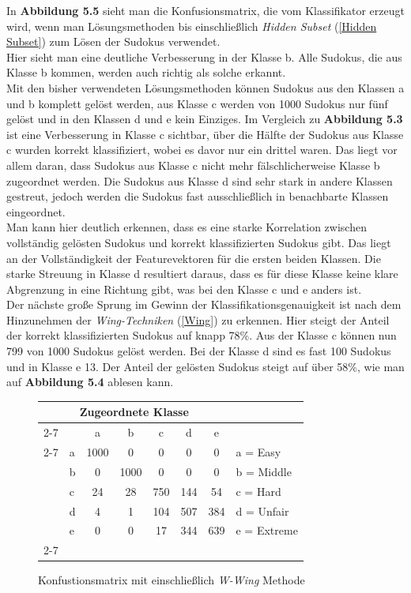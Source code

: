\noindent In \textbf{Abbildung 5.5} sieht man die Konfusionsmatrix, die vom Klassifikator erzeugt wird, wenn man Lösungsmethoden bis einschließlich \textit{Hidden Subset} (\ref{Hidden Subset}) zum Lösen der Sudokus verwendet.\\
Hier sieht man eine deutliche Verbesserung in der Klasse b. Alle Sudokus, die aus Klasse b kommen, werden auch richtig als solche erkannt.\\
Mit den bisher verwendeten Lösungsmethoden können Sudokus aus den Klassen a und b komplett gelöst werden, aus Klasse c werden von 1000 Sudokus nur fünf gelöst und in den Klassen d und e kein Einziges. Im Vergleich zu \textbf{Abbildung 5.3} ist eine Verbesserung in Klasse c sichtbar, über die Hälfte der Sudokus aus Klasse c wurden korrekt klassifiziert, wobei es davor nur ein drittel waren. Das liegt vor allem daran, dass Sudokus aus Klasse c nicht mehr fälschlicherweise Klasse b zugeordnet werden. Die Sudokus aus Klasse d sind sehr stark in andere Klassen gestreut, jedoch werden die Sudokus fast ausschließlich in benachbarte Klassen eingeordnet.\\
Man kann hier deutlich erkennen, dass es eine starke Korrelation zwischen vollständig gelösten Sudokus und korrekt klassifizierten Sudokus gibt. Das liegt an der Vollständigkeit der Featurevektoren für die ersten beiden Klassen. Die starke Streuung in Klasse d resultiert daraus, dass es für diese Klasse keine klare Abgrenzung in eine Richtung gibt, was bei den Klasse c und e anders ist.\\
Der nächste große Sprung im Gewinn der Klassifikationsgenauigkeit ist nach dem Hinzunehmen der \textit{Wing-Techniken} (\ref{Wing}) zu erkennen. Hier steigt der Anteil der korrekt klassifizierten Sudokus auf knapp 78\%. Aus der Klasse c können nun 799 von 1000 Sudokus gelöst werden. Bei der Klasse d sind es fast 100 Sudokus und in Klasse e 13. Der Anteil der gelösten Sudokus steigt auf über 58\%, wie man auf \textbf{Abbildung 5.4} ablesen kann.\\
\begin{figure}[H]
\centering
\begin{tabular}{ l | l |  c  c  c  c  c | l}
\multicolumn{7}{c}{\textbf{Zugeordnete Klasse}}\\
\cline{2-7}
\multirow{6}{*}{\begin{turn}{90}\textbf{Ursprüngliche Klasse}\end{turn}}
 &  & a & b & c & d & e\\
\cline{2-7}
& a & 1000 & 0 & 0 & 0 & 0 & a = Easy \\
& b & 0 & 1000 & 0 & 0 & 0 & b = Middle \\
& c & 24 & 28 & 750 & 144 & 54 & c = Hard \\
& d & 4 & 1 & 104 & 507 & 384 & d = Unfair \\
& e & 0 & 0 & 17 & 344 & 639 & e = Extreme \\
\cline{2-7}
\end{tabular}
\caption{Konfustionsmatrix mit einschließlich \textit{W-Wing} Methode}
\end{figure}
